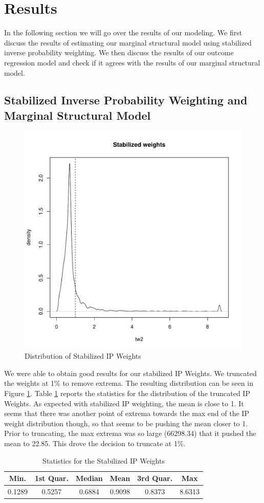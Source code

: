 \documentclass[11pt, conference,compsoc]{IEEEtran}
\begin{document}
\section{Results}
In the following section we will go over the results of our modeling. We first discuss the results of estimating our marginal structural model using stabilized inverse probability weighting. We then discuss the results of our outcome regression model and check if it agrees with the results of our marginal structural model.
\subsection{Stabilized Inverse Probability Weighting and Marginal Structural Model}
\begin{figure} 
	\centering
	\includegraphics[width=.5\textwidth]{weights}
	\caption{Distribution of Stabilized IP Weights}
    \label{figweights}
\end{figure}
We were able to obtain good results for our stabilized IP Weights. We truncated the weights at 1\% to remove extrema. The resulting distribution can be seen in Figure \ref{figweights}. Table \ref{ipwtable} reports the statistics for the distribution of the truncated IP Weights. As expected with stabilized IP weighting, the mean is close to 1. It seems that there was another point of extrema towards the max end of the IP weight distribution though, so that seems to be pushing the mean closer to 1. Prior to truncating, the max extrema was so large (66298.34) that it pushed the mean to 22.85. This drove the decision to truncate at 1\%.

\begin{table}
\caption{Statistics for the Stabilized IP Weights}
\label{ipwtable}
\begin{center}
\begin{tabular}{ |c |c| c |c|c|c|}
\hline
Min. & 1st Quar. &Median & Mean & 3rd Quar. & Max\\ \hline
0.1289 &0.5257 & 0.6884 & 0.9098 & 0.8373 & 8.6313  \\ \hline
\end{tabular}
\end{center}
\end{table}
\end{document}
